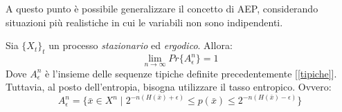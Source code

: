A questo punto è possibile generalizzare il concetto di AEP, considerando situazioni più realistiche in cui le variabili 
non sono indipendenti.

\begin{teorema}
\mbox{}

 Sia $\{X_t\}_t$ un processo \textit{stazionario} ed \textit{ergodico}. Allora:
 \[
  \lim_{n \to \infty} Pr\{A_{\epsilon}^n\}=1
 \]
 Dove $A_{\epsilon}^n$ è l'insieme delle sequenze tipiche definite precedentemente [\ref{tipiche}]. Tuttavia, al posto dell'entropia, 
 bisogna utilizzare il tasso entropico. Ovvero:
 \[
  A_{\epsilon}^n=\{ \bar{x} \in X^n \mid 2^{-n(H(\bar{x})+\epsilon)} \le p(\bar{x}) \le 2^{-n(H(\bar{x})-\epsilon)} \}
 \]

\end{teorema}
